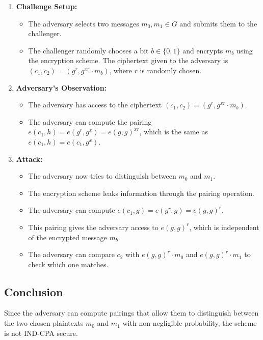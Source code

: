 \documentclass[12pt]{article}
\begin{document}
\begin{enumerate}
    \item \textbf{Challenge Setup:}
    \begin{itemize}
        \item The adversary selects two messages \( m_0, m_1 \in G \) and submits them to the challenger.
        \item The challenger randomly chooses a bit \( b \in \{0, 1\} \) and encrypts \( m_b \) using the encryption scheme. The ciphertext given to the adversary is \( (c_1, c_2) = (g^r, g^{xr} \cdot m_b) \), where \( r \) is randomly chosen.
    \end{itemize}

    \item \textbf{Adversary's Observation:}
    \begin{itemize}
        \item The adversary has access to the ciphertext \( (c_1, c_2) = (g^r, g^{xr} \cdot m_b) \).
        \item The adversary can compute the pairing \( e(c_1, h) = e(g^r, g^x) = e(g, g)^{xr} \), which is the same as \( e(c_1, h) = e(c_1, g^x) \).
    \end{itemize}

    \item \textbf{Attack:}
    \begin{itemize}
        \item The adversary now tries to distinguish between \( m_0 \) and \( m_1 \).
        \item The encryption scheme leaks information through the pairing operation.
        \item The adversary can compute \( e(c_1, g) = e(g^r, g) = e(g, g)^r \).
        \item This pairing gives the adversary access to \( e(g, g)^r \), which is independent of the encrypted message \( m_b \).
        \item The adversary can compare \( c_2 \) with \( e(g, g)^r \cdot m_0 \) and \( e(g, g)^r \cdot m_1 \) to check which one matches.
    \end{itemize}
\end{enumerate}

\subsection{Conclusion}

Since the adversary can compute pairings that allow them to distinguish between the two chosen plaintexts \( m_0 \) and \( m_1 \) with non-negligible probability, the scheme is not IND-CPA secure.
\end{document}
